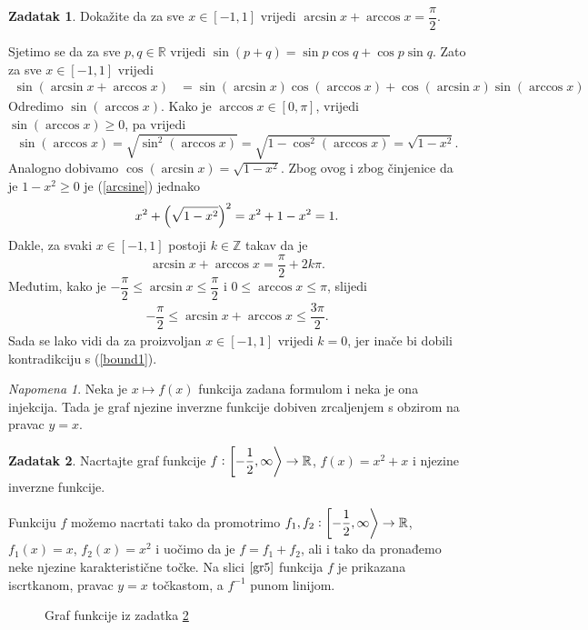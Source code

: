 \documentclass{book}
\let\originalleft\left
\let\originalright\right
\renewcommand{\left}{\mathopen{}\mathclose\bgroup\originalleft}
\renewcommand{\right}{\aftergroup\egroup\originalright}
\renewenvironment{proof}{%
    \vspace{-\parskip}\begin{oldproof}%
    }{%
    \end{oldproof}%
}
\theoremstyle{definition}
\theoremstyle{definition}
\newtheorem{exercise}{Zadatak}
\theoremstyle{remark}
\newtheorem{remark}{Napomena}
\begin{document}
\begin{exercise}
Dokažite da za sve $x\in [-1, 1]$ vrijedi $\arcsin{x}+\arccos{x}=\dfrac{\pi}{2}$.
\end{exercise}
\begin{proof}[Rješenje]
Sjetimo se da za sve $p, q\in \mathbb{R}$ vrijedi $\sin(p+q)=\sin{p}\cos{q}+\cos{p}\sin{q}$. Zato za sve $x\in [-1, 1]$ vrijedi
\begin{align}
\label{arcsine}
\sin(\arcsin{x}+\arccos{x})&=\sin(\arcsin{x})\cos(\arccos{x})+\cos(\arcsin{x})\sin(\arccos{x})
\end{align}
Odredimo $\sin(\arccos{x})$. Kako je $\arccos{x}\in [0, \pi]$, vrijedi $\sin(\arccos{x})\geq 0$, pa vrijedi
$$\sin(\arccos{x})=\sqrt{\sin^2(\arccos{x})}=\sqrt{1-\cos^2(\arccos{x})}=\sqrt{1-x^2}.$$
Analogno dobivamo $\cos(\arcsin{x})=\sqrt{1-x^2}$. Zbog ovog i zbog činjenice da je $1-x^2\geq 0$ je (\ref{arcsine}) jednako
$$x^2+\left(\sqrt{1-x^2}\right)^2=x^2+1-x^2=1.$$
Dakle, za svaki $x\in [-1, 1]$ postoji $k\in \mathbb{Z}$ takav da je
$$\arcsin{x}+\arccos{x}=\dfrac{\pi}{2}+2k\pi.$$
Međutim, kako je $-\dfrac{\pi}{2}\leq \arcsin{x}\leq \dfrac{\pi}{2}$ i $0\leq \arccos{x}\leq \pi$, slijedi 
\begin{align}
\label{bound1}
-\dfrac{\pi}{2}\leq \arcsin{x}+\arccos{x}\leq \dfrac{3\pi}{2}.
\end{align}
Sada se lako vidi da za proizvoljan $x\in [-1, 1]$ vrijedi $k=0$, jer inače bi dobili kontradikciju s (\ref{bound1}).
\end{proof}
\begin{remark}
Neka je $x\mapsto f(x)$ funkcija zadana formulom i neka je ona injekcija. Tada je graf njezine inverzne funkcije dobiven zrcaljenjem s obzirom na pravac $y=x$.
\end{remark}
\begin{exercise}
\label{invgraph}
Nacrtajte graf funkcije $f : \left[-\dfrac{1}{2}, \infty\right\rangle\to \mathbb{R}$, $f(x)=x^2+x$ i njezine inverzne funkcije.
\end{exercise}
\begin{proof}[Rješenje]
Funkciju $f$ možemo nacrtati tako da promotrimo $f_1, f_2 : \left[-\dfrac{1}{2}, \infty\right\rangle\to \mathbb{R}$, $f_1(x)=x$, $f_2(x)=x^2$ i uočimo da je $f=f_1+f_2$, ali i tako da pronađemo neke njezine karakteristične točke. Na slici $\ref{gr5}$ funkcija $f$ je prikazana iscrtkanom, pravac $y=x$ točkastom, a $f^{-1}$ punom linijom.
\begin{figure}[ht]
\begin{center}
\end{center}
\caption{\label{gr5} Graf funkcije iz zadatka \ref{invgraph}}
\end{figure}
\end{proof}
\end{document}
